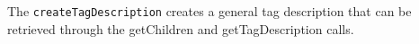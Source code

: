 The \verb+createTagDescription+ creates a general tag description that can be
retrieved through the getChildren and getTagDescription calls.
